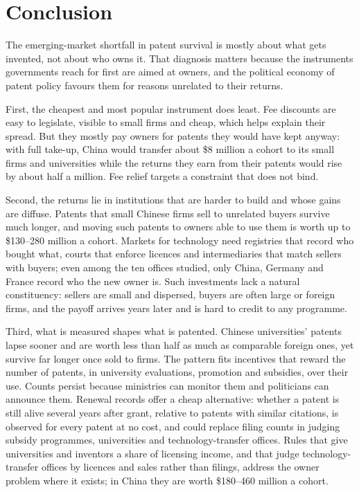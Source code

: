 \section{Conclusion}\label{sec:conclusion}

The emerging-market shortfall in patent survival is mostly about what gets invented, not about who owns it. That
diagnosis matters because the instruments governments reach for first are aimed at owners, and the political
economy of patent policy favours them for reasons unrelated to their returns.

First, the cheapest and most popular instrument does least. Fee discounts are easy to legislate, visible to small
firms and cheap, which helps explain their spread. But they mostly pay owners for patents they would have kept
anyway: with full take-up, China would transfer about \$8 million a cohort to its small firms and universities
while the returns they earn from their patents would rise by about half a million. Fee relief targets a constraint
that does not bind.

Second, the returns lie in institutions that are harder to build and whose gains are diffuse. Patents that small
Chinese firms sell to unrelated buyers survive much longer, and moving such patents to owners able to use them is
worth up to \$130--280 million a cohort. Markets for technology need registries that record who bought what, courts
that enforce licences and intermediaries that match sellers with buyers; even among the ten offices studied, only
China, Germany and France record who the new owner is. Such investments lack a natural constituency: sellers are
small and dispersed, buyers are often large or foreign firms, and the payoff arrives years later and is hard to
credit to any programme.

Third, what is measured shapes what is patented. Chinese universities' patents lapse sooner and are worth less than
half as much as comparable foreign ones, yet survive far longer once sold to firms. The pattern fits incentives that
reward the number of patents, in university evaluations, promotion and subsidies, over their use. Counts persist
because ministries can monitor them and politicians can announce them. Renewal records offer a cheap alternative:
whether a patent is still alive several years after grant, relative to patents with similar citations, is observed
for every patent at no cost, and could replace filing counts in judging subsidy programmes, universities and
technology-transfer offices. Rules that give universities and inventors a share of licensing income, and that judge
technology-transfer offices by licences and sales rather than filings, address the owner problem where it exists;
in China they are worth \$180--460 million a cohort.


